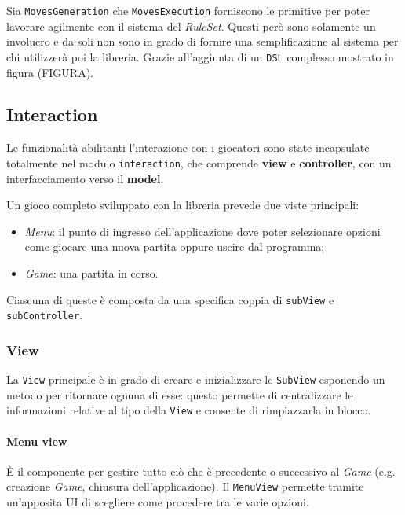 Sia \texttt{MovesGeneration} che \texttt{MovesExecution} forniscono le primitive per poter lavorare agilmente con il sistema del \textit{RuleSet}.
%
Questi però sono solamente un involucro e da soli non sono in grado di fornire una semplificazione al sistema per chi utilizzerà poi la libreria.
%
Grazie all'aggiunta di un \texttt{DSL} complesso mostrato in figura (FIGURA).

\subsection{Interaction}

Le funzionalità abilitanti l'interazione con i giocatori sono state incapsulate totalmente nel modulo \texttt{interaction}, che comprende \textbf{view} e \textbf{controller}, con un interfacciamento verso il \textbf{model}.

Un gioco completo sviluppato con la libreria prevede due viste principali:
\begin{itemize}
    \item \textit{Menu}: il punto di ingresso dell'applicazione dove poter selezionare opzioni come giocare una nuova partita oppure uscire dal programma;
    \item \textit{Game}: una partita in corso.
\end{itemize}
%
Ciascuna di queste è composta da una specifica coppia di \texttt{subView} e \texttt{subController}.
%

\subsubsection{View}
La \texttt{View} principale è in grado di creare e inizializzare le \texttt{SubView} esponendo un metodo per ritornare ognuna di esse: questo permette di centralizzare le informazioni relative al tipo della \texttt{View} e consente di rimpiazzarla in blocco. %
\paragraph{Menu view} 
%
È il componente per gestire tutto ciò che è precedente o successivo al \textit{Game} (e.g. creazione \textit{Game}, chiusura dell'applicazione).
%
Il \texttt{MenuView} permette tramite un'apposita UI di scegliere come procedere tra le varie opzioni.

